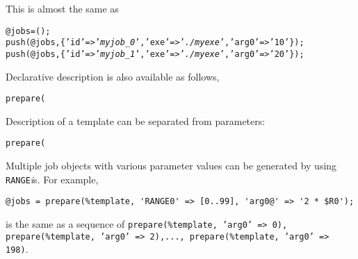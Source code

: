 \documentclass[a4paper,10pt]{report}
\begin{document}
This is almost the same as
\begin{boxnote}
\begin{alltt}
@jobs = ();
push(@jobs, \{'id' => '\textit{myjob_0}', 'exe' => '\textit{./myexe}', 'arg0' => '10'\});
push(@jobs, \{'id' => '\textit{myjob_1}', 'exe' => '\textit{./myexe}', 'arg0' => '20'\});
\end{alltt}
\end{boxnote}
\vspace{\baselineskip}

Declarative description is also available as follows,
\begin{boxnote}
\begin{alltt}
%template = ('id' => '\textit{myjob}', 'exe' => '\textit{./myexe}', 'arg0@' => [10,20]);
prepare(%template);
\end{alltt}
\end{boxnote}
\vspace{\baselineskip}

Description of a template can be separated from parameters:
\begin{boxnote}
\begin{alltt}
%template = ('id' => '\textit{myjob}', 'exe' => '\textit{./myexe}');
prepare(%template, 'arg0@' => [10,20]);
\end{alltt}
\end{boxnote}
\vspace{\baselineskip}

Multiple job objects with various parameter values can be generated by using
\texttt{RANGE}\textit{i}s.  For example,
\begin{boxnote}
\begin{verbatim}
@jobs = prepare(%template, 'RANGE0' => [0..99], 'arg0@' => '2 * $R0');
\end{verbatim}
\end{boxnote}
\vspace{\baselineskip}
\noindent
is the same as a sequence of \texttt{prepare(\%template, 'arg0' => 0),
prepare(\%template, 'arg0' => 2),..., prepare(\%template, 'arg0' => 198)}.

\subsubsection{\advanced}
\end{document}
